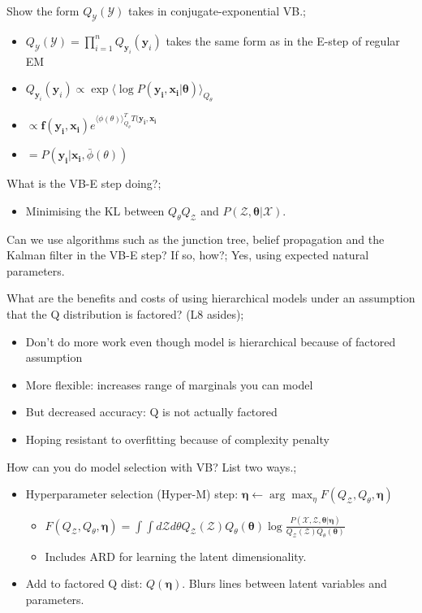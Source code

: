 \documentclass{article}
\begin{document}
Show the form $Q_\mathcal{Y}(\mathcal{Y})$ takes in conjugate-exponential VB.; \begin{itemize} \item $Q_\mathcal{Y}(\mathcal{Y}) = \prod_{i=1}^n Q_{\bm{y}_i}(\bm{y}_i)$ takes the same form as in the E-step of regular EM \item $Q_{\bm{y}_i}(\bm{y}_i)\propto \exp \langle \log P(\bm{y_i, x_i|\theta})\rangle_{Q_{\theta}}$ \item $\propto \bm{f(y_i, x_i)}e^{\langle \phi(\theta)\rangle^T_{Q_\theta}T(\bm{y_i, x_i}}$ \item $=P(\bm{y_i|x_i}, \bar{\phi}(\theta))$ \end{itemize} 

What is the VB-E step doing?; \begin{itemize} \item Minimising the KL between $Q_\theta Q_{\mathcal{Z}}$ and $P(\mathcal{Z},\bm{\theta}|\mathcal{X})$. \end{itemize}

Can we use algorithms such as the junction tree, belief propagation and the Kalman filter in the VB-E step? If so, how?; Yes, using expected natural parameters.

What are the benefits and costs of using hierarchical models under an assumption that the Q distribution is factored? (L8 asides); \begin{itemize} \item Don't do more work even though model is hierarchical because of factored assumption \item More flexible: increases range of marginals you can model \item But decreased accuracy: Q is not actually factored \item Hoping resistant to overfitting because of complexity penalty \end{itemize}

How can you do model selection with VB? List two ways.; \begin{itemize} \item Hyperparameter selection (Hyper-M) step: $\bm{\eta} \leftarrow \arg\max_{\eta} F(Q_\mathcal{Z}, Q_\theta, \bm{\eta})$ \begin{itemize} \item $F(Q_\mathcal{Z}, Q_\theta, \bm{\eta}) = \int \int d\mathcal{Z}d\theta Q_{\mathcal{Z}}(\mathcal{Z})Q_\theta(\bm{\theta})\log\frac{P(\mathcal{X, Z},\bm{\theta}|\bm{\eta})}{Q_\mathcal{Z}(\mathcal{Z})Q_\theta(\bm{\theta})}$ \item Includes ARD for learning the latent dimensionality.  \end{itemize} \item Add to factored Q dist: $Q(\bm{\eta})$. Blurs lines between latent variables and parameters.  \end{itemize}
\end{document}
